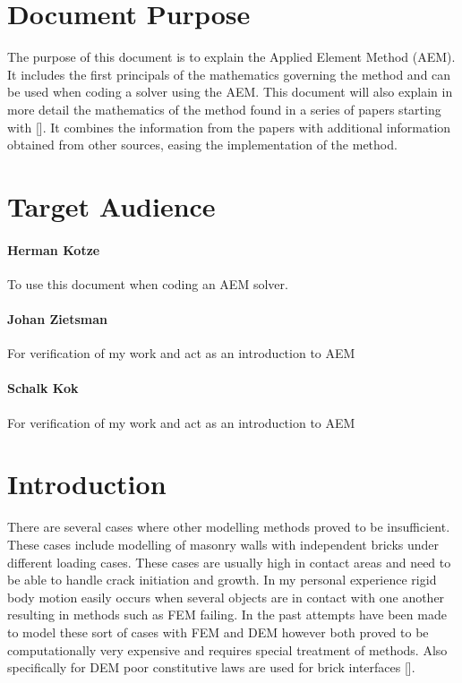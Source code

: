 \documentclass[a4paper,12pt]{article}
\title{\mytitle}
\author{\myname}
\affil{\myaffiliation \\ \mydegree}
\date{\today}
\begin{document}

\thispagestyle{headings}
\maketitle
\newpage
\tableofcontents
\newpage
\listoffigures
\newpage
\lstlistoflistings
\cleardoublepage 
{}
\pagestyle{headings}
\setlength{\headheight}{15.2pt}
\pagestyle{fancy}
\renewcommand{\footrulewidth}{0.4pt}%


\section*{Document Purpose}
The purpose of this document is to explain the Applied Element Method (AEM).  It includes the first principals of the mathematics governing the method and can be used when coding a solver using the AEM. This document will also explain in more detail the mathematics of the method found in a series of papers starting with [\cite{First_AEM}].  It combines the information from the papers with additional information obtained from other sources, easing the implementation of the method. 


\section*{Target Audience}

\paragraph{Herman Kotze}  
To use this document when coding an AEM solver.   
\paragraph{Johan Zietsman}  
For verification of my work and act as an introduction to AEM
\paragraph{Schalk Kok}  
For verification of my work and act as an introduction to AEM


\newpage

\section{Introduction}
There are several cases where other modelling methods proved to be insufficient.  These cases include modelling of masonry walls with independent bricks under different loading cases.  These cases are usually high in contact areas and need to be able to handle crack initiation and growth.  In my personal experience rigid body motion easily occurs when several objects are in contact with one another resulting in methods such as FEM failing.  In the past attempts have been made to model these sort of cases with FEM and DEM however both proved to be computationally very expensive and requires special treatment of methods.  Also specifically for DEM poor constitutive laws are used for brick interfaces [\cite{Brick_Masonry_wall}].   
\end{document}
